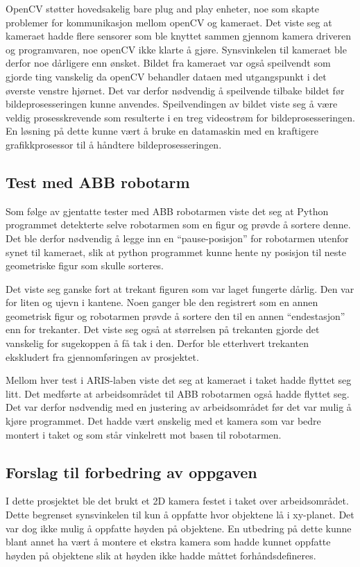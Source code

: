 \documentclass[conference]{IEEEtran}
\begin{document}
        OpenCV støtter hovedsakelig bare plug and play enheter, noe som skapte problemer for kommunikasjon mellom openCV og kameraet. Det viste seg at kameraet hadde flere sensorer som ble knyttet sammen gjennom kamera driveren og programvaren, noe openCV ikke klarte å gjøre. Synsvinkelen til kameraet ble derfor noe dårligere enn ønsket. Bildet fra kameraet var også speilvendt som gjorde ting vanskelig da openCV behandler dataen med utgangspunkt i det øverste venstre hjørnet. Det var derfor nødvendig å speilvende tilbake bildet før bildeprosesseringen kunne anvendes. 
        Speilvendingen av bildet viste seg å være veldig prosesskrevende som resulterte i en treg videostrøm for bildeprosesseringen. En løsning på dette kunne vært å bruke en datamaskin med en kraftigere grafikkprosessor til å håndtere bildeprosesseringen. 

    \subsection{Test med ABB robotarm}
        Som følge av gjentatte tester med ABB robotarmen viste det seg at Python programmet detekterte selve robotarmen som en figur og prøvde å sortere denne. Det ble derfor nødvendig å legge inn en “pause-posisjon” for robotarmen utenfor synet til kameraet, slik at python programmet kunne hente ny posisjon til neste geometriske figur som skulle sorteres.

        Det viste seg ganske fort at trekant figuren som var laget fungerte dårlig. Den var for liten og ujevn i kantene. Noen ganger ble den registrert som en annen geometrisk figur og robotarmen prøvde å sortere den til en annen \enquote{endestasjon} enn for trekanter. Det viste seg også at størrelsen på trekanten gjorde det vanskelig for sugekoppen å få tak i den. Derfor ble etterhvert trekanten ekskludert fra gjennomføringen av prosjektet. 

        Mellom hver test i ARIS-laben viste det seg at kameraet i taket hadde flyttet seg litt. Det medførte at arbeidsområdet til ABB robotarmen også hadde flyttet seg. Det var derfor nødvendig med en justering av arbeidsområdet før det var mulig å kjøre programmet. Det hadde vært ønskelig med et kamera som var bedre montert i taket og som står vinkelrett mot basen til robotarmen.

    \subsection{Forslag til forbedring av oppgaven}
        I dette prosjektet ble det brukt et 2D kamera festet i taket over arbeidsområdet. Dette begrenset synsvinkelen til kun å oppfatte hvor objektene lå i xy-planet. Det var dog ikke mulig å oppfatte høyden på objektene. En utbedring på dette kunne blant annet ha vært å montere et ekstra kamera som hadde kunnet oppfatte høyden på objektene slik at høyden ikke hadde måttet forhåndsdefineres. 
\end{document}
